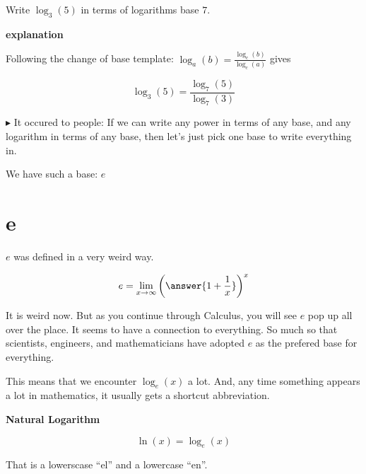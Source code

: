 \documentclass{ximera}
\begin{document}
\begin{example}


Write $\log_3(5)$ in terms of logarithms base $7$.


\textbf{\textcolor{red!75!green}{explanation}} 


Following the change of base template: $\log_a(b)  =  \frac{\log_c(b)}{\log_c(a)} $ gives



\[   \log_3(5)  =  \frac{\log_7(5)}{\log_7(3)}         \]




\end{example}


















$\blacktriangleright$ It occured to people: If we can write any power in terms of any base, and any logarithm in terms of any base, then let's just pick one base to write everything in.


We have such a base: $e$


\section*{e}



\begin{fact} $e$ was defined in a very weird way.

\[   e = \lim_{x \to \infty}  \left(\answer{1 + \frac{1}{x}}\right)^x      \]

\end{fact}




It is weird now.  But as you continue through Calculus, you will see $e$ pop up all over the place.  It seems to have a connection to everything.  So much so that scientists, engineers, and mathematicians have  adopted $e$ as the prefered base for everything.


This means that we encounter $\log_e(x)$ a lot.  And, any time something appears a lot in mathematics, it usually gets a shortcut abbreviation.




\begin{definition}  \textbf{\textcolor{green!50!black}{Natural Logarithm}} 


\[     \ln(x) = \log_e(x) \]


That is a lowerscase ``el'' and a lowercase ``en''.


\end{definition}
\end{document}
